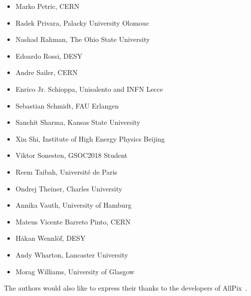 \begin{itemize}
\item Marko Petric, CERN
\item Radek Privara, Palacky University Olomouc
\item Nashad Rahman, The Ohio State University
\item Edoardo Rossi, DESY
\item Andre Sailer, CERN
\item Enrico Jr. Schioppa, Unisalento and INFN Lecce
\item Sebastian Schmidt, FAU Erlangen
\item Sanchit Sharma, Kansas State University
\item Xin Shi, Institute of High Energy Physics Beijing
\item Viktor Sonesten, GSOC2018 Student
\item Reem Taibah, Université de Paris
\item Ondrej Theiner, Charles University
\item Annika Vauth, University of Hamburg
\item Mateus Vicente Barreto Pinto, CERN
\item Håkan Wennlöf, DESY
\item Andy Wharton, Lancaster University
\item Morag Williams, University of Glasgow
\end{itemize}

The authors would also like to express their thanks to the developers of AllPix~\cite{ap1wiki,ap1git}.
